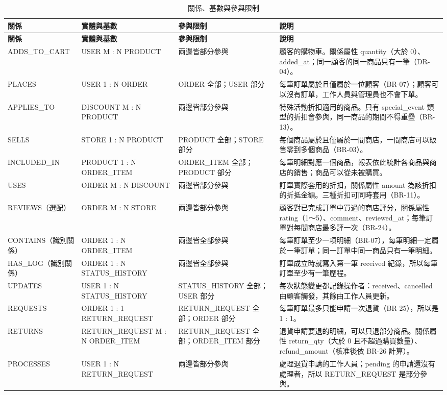 \begingroup\small
\begin{xltabular}{\linewidth}{|>{\centering\arraybackslash}p{2.5cm}|>{\centering\arraybackslash}p{3.5cm}|>{\raggedright\arraybackslash}p{3.3cm}|>{\raggedright\arraybackslash}X|}
\caption{關係、基數與參與限制}\label{tab:rel}\\
\hline{}\textbf{關係} & \textbf{實體與基數} & \textbf{參與限制} & \textbf{說明}\\\hline\endfirsthead
\hline{}\textbf{關係} & \textbf{實體與基數} & \textbf{參與限制} & \textbf{說明}\\\hline\endhead
ADDS\_TO\_CART & USER M : N PRODUCT & 兩邊皆部分參與 & 顧客的購物車。關係屬性 quantity（大於 0）、added\_at；同一顧客的同一商品只有一筆（DR-04）。\\\hline
PLACES & USER 1 : N ORDER & ORDER 全部；USER 部分 & 每筆訂單屬於且僅屬於一位顧客（BR-07）；顧客可以沒有訂單，工作人員與管理員也不會下單。\\\hline
APPLIES\_TO & DISCOUNT M : N PRODUCT & 兩邊皆部分參與 & 特殊活動折扣適用的商品。只有 special\_event 類型的折扣會參與，同一商品的期間不得重疊（BR-13）。\\\hline
SELLS & STORE 1 : N PRODUCT & PRODUCT 全部；STORE 部分 & 每個商品屬於且僅屬於一間商店，一間商店可以販售零到多個商品（BR-03）。\\\hline
INCLUDED\_IN & PRODUCT 1 : N ORDER\_ITEM & ORDER\_ITEM 全部；PRODUCT 部分 & 每筆明細對應一個商品，報表依此統計各商品與商店的銷售；商品可以從未被購買。\\\hline
USES & ORDER M : N DISCOUNT & 兩邊皆部分參與 & 訂單實際套用的折扣，關係屬性 amount 為該折扣的折抵金額。三種折扣可同時套用（BR-11）。\\\hline
REVIEWS（選配） & ORDER M : N STORE & 兩邊皆部分參與 & 顧客對已完成訂單中買過的商店評分，關係屬性 rating（1～5）、comment、reviewed\_at；每筆訂單對每間商店最多評一次（BR-24）。\\\hline
CONTAINS（識別關係） & ORDER 1 : N ORDER\_ITEM & 兩邊皆全部參與 & 每筆訂單至少一項明細（BR-07），每筆明細一定屬於一筆訂單；同一訂單中同一商品只有一筆明細。\\\hline
HAS\_LOG（識別關係） & ORDER 1 : N STATUS\_HISTORY & 兩邊皆全部參與 & 訂單成立時就寫入第一筆 received 紀錄，所以每筆訂單至少有一筆歷程。\\\hline
UPDATES & USER 1 : N STATUS\_HISTORY & STATUS\_HISTORY 全部；USER 部分 & 每次狀態變更都記錄操作者：received、cancelled 由顧客觸發，其餘由工作人員更新。\\\hline
REQUESTS & ORDER 1 : 1 RETURN\_REQUEST & RETURN\_REQUEST 全部；ORDER 部分 & 每筆訂單最多只能申請一次退貨（BR-25），所以是 1 : 1。\\\hline
RETURNS & RETURN\_REQUEST M : N ORDER\_ITEM & RETURN\_REQUEST 全部；ORDER\_ITEM 部分 & 退貨申請要退的明細，可以只退部分商品。關係屬性 return\_qty（大於 0 且不超過購買數量）、refund\_amount（核准後依 BR-26 計算）。\\\hline
PROCESSES & USER 1 : N RETURN\_REQUEST & 兩邊皆部分參與 & 處理退貨申請的工作人員；pending 的申請還沒有處理者，所以 RETURN\_REQUEST 是部分參與。\\\hline
\end{xltabular}
\endgroup

